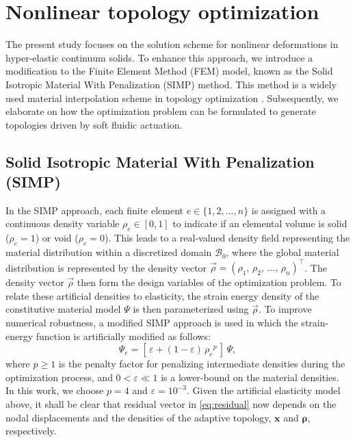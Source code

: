 \section{Nonlinear topology optimization}
\label{chap:topo} 
The present study focuses on the solution scheme for nonlinear deformations in hyper-elastic continuum solids. To enhance this approach, we introduce a modification to the Finite Element Method (FEM) model, known as the Solid Isotropic Material With Penalization (SIMP) method. This method is a widely used material interpolation scheme in topology optimization \cite{Bendsoe2003,Gain2013Dec,Talischi2012Mar,Vasista2013Jul}. Subsequently, we elaborate on how the optimization problem can be formulated to generate topologies driven by soft fluidic actuation.

\subsection{Solid Isotropic Material With Penalization (SIMP)}
In the SIMP approach, each finite element $e \in \{1,2,...,n\}$ is assigned with a continuous density variable $\rho_e \in [0,1]$ to indicate if an elemental volume is solid ($\rho_e = 1$) or void ($\rho_e = 0$). This leads to a real-valued density field representing the material distribution within a discretized domain $\mathcal{B}_0$, where the global material distribution is represented by the density vector $\vec{\rho} = \left(\rho_1,\,\rho_2,\,...,\,\rho_n\right)^\top$. The density vector $\vec{\rho}$ then form the design variables of the optimization problem. To relate these artificial densities to elasticity, the strain energy density of the constitutive material model ${\Psi}$ is then parameterized using $\vec{\rho}$. To improve numerical robustness, a modified SIMP approach is used in which the strain-energy function is artificially modified as follows:
%
\begin{equation}
{\Psi}_e = [\,\varepsilon + (1-\varepsilon)\,{\rho_e}^p\,]\, {\Psi}, \label{eq:simp}
\end{equation}
%
where $p\ge 1$ is the penalty factor for penalizing intermediate densities during the optimization process, and $0 < \varepsilon \ll 1$ is a lower-bound on the material densities. In this work, we choose $p = 4$ and $\varepsilon = 10^{-3}$. Given the artificial elasticity model above, it shall be clear that residual vector in \eqref{eq:residual} now depends on the nodal displacements and the densities of the adaptive topology, $\boldsymbol{x}$ and $\boldsymbol{\rho}$, respectively.


